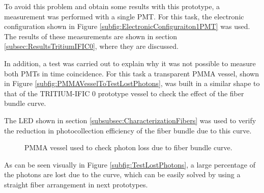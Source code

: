 To avoid this problem and obtain some results with this prototype, a measurement was performed with a single PMT. For this task, the electronic configuration shown in Figure \ref{subfig:ElectronicConfiguraiton1PMT} was used. The results of these measurements are shown in section \ref{subsec:ResultsTritiumIFIC0}, where they are discussed.

In addition, a test was carried out to explain why it was not possible to measure both PMTs in time coincidence. For this task a transparent PMMA vessel, shown in Figure \ref{subfig:PMMAVesselToTestLostPhotons}, was built in a similar shape to that of the TRITIUM-IFIC 0 prototype vessel to check the effect of the fiber bundle curve. 

The LED shown in section \ref{subsubsec:CharacterizationFibers} was used to verify the reduction in photocollection efficiency of the fiber bundle due to this curve. 

\begin{figure}[h]
 \centering
 \caption{PMMA vessel used to check photon loss due to fiber bundle curve.}
 \label{fig:TestLostPhotons}
\end{figure}

As can be seen visually in Figure \ref{subfig:TestLostPhotons}, a large percentage of the photons are lost due to the curve, which can be easily solved by using a straight fiber arrangement in next prototypes.



